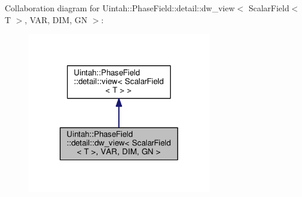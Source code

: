 Collaboration diagram for Uintah\+:\+:Phase\+Field\+:\+:detail\+:\+:dw\+\_\+view$<$ Scalar\+Field$<$ T $>$, V\+AR, D\+IM, GN $>$\+:\nopagebreak
\begin{figure}[H]
\begin{center}
\leavevmode
\includegraphics[width=228pt]{classUintah_1_1PhaseField_1_1detail_1_1dw__view_3_01ScalarField_3_01T_01_4_00_01VAR_00_01DIM_00_01GN_01_4__coll__graph}
\end{center}
\end{figure}
